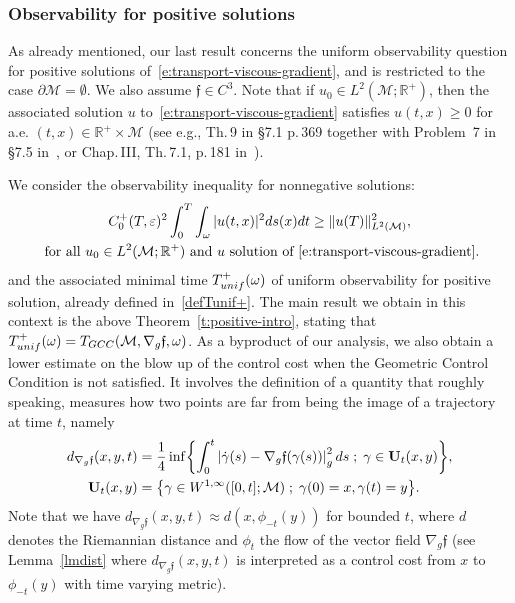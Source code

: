 \documentclass[11pt]{article}
\newcommand{\eg}{e.g.,\xspace}
\numberwithin{equation}{section}
\newcommand{\GCC}{\textup{GCC}}
\newcommand{\unif}{\textup{unif}}
\newcommand{\sep}{\;;\;}
\theoremstyle{definition}
\newcommand{\M}{\ensuremath{\mathcal M}}
\newcommand{\mb}[1]{\ensuremath{\mathbb{#1}}}
\newcommand{\R}{{\mb{R}}}
\newcommand{\f}{\ensuremath{\mathfrak{f}}}
\let\d\partial
\let\eps\varepsilon
\begin{document}
\subsubsection{Observability for positive solutions}
As already mentioned, our last result concerns the uniform observability question for positive solutions of~\eqref{e:transport-viscous-gradient}, and is restricted to the case $\d\M=\emptyset$. We also assume $\f\in C^3$.
Note that if $u_0 \in L^2(\M; \R^+)$, then the associated solution $u$ to~\eqref{e:transport-viscous-gradient} satisfies $u(t,x) \geq 0$ for a.e. $(t,x) \in \R^+\times\M$ (see \eg Th.\,9 in \S7.1 p.\,369 together with Problem~7 in \S 7.5 in~\cite{Evans:98}, or Chap.\,III, Th.\,7.1, p.\,181 in~\cite{LSU:68}).

We consider the observability inequality for nonnegative solutions:
\begin{multline}
\label{e:transport-viscous-obsplus}
C_0^+(T,\eps)^2 \int_0^T\int_\omega |u(t,x)|^2 ds(x)dt \geq \|u (T)\|_{L^2(\M)}^2, \\
\text{ for all } u_0 \in L^2(\M; \R^+)\text{ and } u \text{ solution of~\eqref{e:transport-viscous-gradient}}.
\end{multline}
and the associated minimal time $T_{\unif}^+(\omega)$ of uniform observability for positive solution, already defined in~\eqref{defTunif+}. The main result we obtain in this context is the above Theorem~\ref{t:positive-intro}, stating that $T_{\unif}^+(\omega)=T_{\GCC}(\M, \nabla_g\f,\omega)$.
As a byproduct of our analysis, we also obtain a lower estimate on the blow up of the control cost when the Geometric Control Condition is not satisfied. It involves the definition of a quantity that roughly speaking, measures how two points are far from being the image of a trajectory at time $t$, namely
\begin{align}
\label{defdXintro} d_{\nabla_g\f}(x,y,t)&=\frac{1}{4} \inf \biggl\{ \int_0^t \left|\dot{\gamma}(s)-\nabla_g \f(\gamma(s))\right|_g^{2} ds\sep \gamma \in \mathbf{U}_t(x,y)
\biggr\}, \\
\mathbf{U}_t(x,y) & = \bigl\{\gamma \in W^{1,\infty} ([0,t] ; \M )\sep\gamma(0)=x, \gamma(t)= y \bigr\}. \notag
\end{align}
Note that we have $ d_{\nabla_g\f}(x,y,t)\approx d(x,\phi_{-t}(y))$ for bounded $t$, where $d$ denotes the Riemannian distance and $\phi_t$ the flow of the vector field $\nabla_g \f$ (see Lemma~\ref{lmdist} where $d_{\nabla_g\f}(x,y,t)$ is interpreted as a control cost from $x$ to $\phi_{-t}(y)$ with time varying metric).
\end{document}
